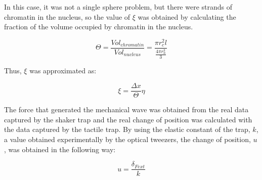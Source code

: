 In this case, it was not a single sphere problem, but there were strands of chromatin in the nucleus, so the value of $\xi$ was obtained by calculating the fraction of the volume occupied by chromatin in the nucleus.

\begin{equation} \label{eqn:frac_nucl_chro}
	\Theta = \frac{Vol_{chromatin}}{Vol_{nucleus}} = \frac{\pi r_{c}^{2} l}{\frac{4\pi r_{n}^{3}}{3}}
\end{equation}

Thus, $\xi$ was approximated as:

\begin{equation} \label{eqn:xi_approx}
	\xi = \frac{\Delta x}{\Theta} \eta
\end{equation}

The force that generated the mechanical wave was obtained from the real data captured by the shaker trap and the real change of position was calculated with the data captured by the tactile trap. By using the elastic constant of the trap, $k$, a value obtained experimentally by the optical tweezers, the change of position, $u$, was obtained in the following way:

\begin{equation} \label{eqn:real_desp}
	u = \frac{\delta_{Fext}}{k}
\end{equation}
